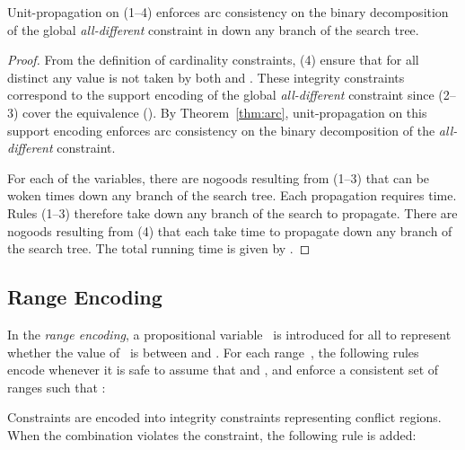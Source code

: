 \documentclass{tlp}
\begin{document}
\begin{corollary}
Unit-propagation on (1--4) enforces arc consistency on the binary decomposition of the global \emph{all-different} constraint in  down any branch of the search tree.
\end{corollary}
\begin{proof}
From the definition of cardinality constraints, (4) ensure that for all distinct  any value  is not taken by both  and . These integrity constraints correspond to the support encoding of the global \emph{all-different} constraint since (2--3) cover the equivalence ().
By Theorem~\ref{thm:arc}, unit-propagation on this support encoding enforces arc consistency on the binary decomposition of the \emph{all-different} constraint.

For each of the  variables, there are  nogoods resulting from (1--3) that can be woken  times down any branch of the search tree. Each propagation requires  time. Rules (1--3) therefore take  down any branch of the search to propagate. There are  nogoods resulting from (4) that each take  time to propagate down any branch of the search tree. The total running time is given by .
\end{proof}


\subsection{Range Encoding}

In the \emph{range encoding}, a propositional variable~ is introduced for all  to represent whether the value of~ is between  and . For each range~, the following  rules encode  whenever it is safe to assume that  and , and enforce a consistent set of ranges such that :

Constraints are encoded into integrity constraints representing conflict regions. When the combination  violates the constraint, the following rule is added:
\end{document}

